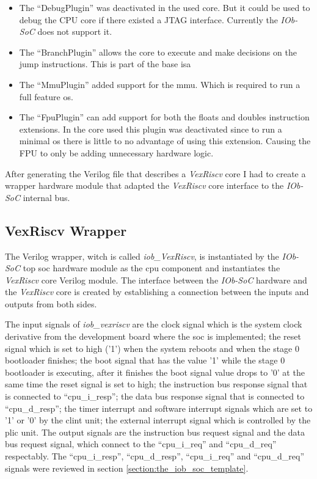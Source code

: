 \begin{itemize}
  \item The \enquote{DebugPlugin} was deactivated in the used core. But it could be used to debug the CPU core if there existed a JTAG interface. Currently the \textit{IOb-SoC} does not support it.
  \item The \enquote{BranchPlugin} allows the core to execute and make decisions on the jump instructions. This is part of the base \acrfull{isa}
  \item The \enquote{MmuPlugin} added support for the \acrfull{mmu}. Which is required to run a full feature \acrshort{os}.
  \item The \enquote{FpuPlugin} can add support for both the floats and doubles instruction extensions. In the core used this plugin was deactivated since to run a minimal \acrshort{os} there is little to no advantage of using this extension. Causing the FPU to only be adding unnecessary hardware logic.
\end{itemize}

After generating the Verilog file that describes a \textit{VexRiscv} core I had to create a wrapper hardware module that adapted the \textit{VexRiscv} core interface to the \textit{IOb-SoC} internal bus.

\subsection{VexRiscv Wrapper}
The Verilog wrapper, witch is called \textit{iob\_VexRiscv}, is instantiated by the \textit{IOb-SoC} top \acrshort{soc} hardware module as the \acrshort{cpu} component and instantiates the \textit{VexRiscv} core Verilog module. The interface between the \textit{IOb-SoC} hardware and the \textit{VexRiscv} core is created by establishing a connection between the inputs and outputs from both sides.

The input signals of \textit{iob\_vexriscv} are the clock signal which is the system clock derivative from the development board where the \acrshort{soc} is implemented; the reset signal which is set to high ('1') when the system reboots and when the stage 0 bootloader finishes; the boot signal that has the value '1' while the stage 0 bootloader is executing, after it finishes the boot signal value drops to '0' at the same time the reset signal is set to high; the instruction bus response signal that is connected to \enquote{cpu\_i\_resp}; the data bus response signal that is connected to \enquote{cpu\_d\_resp}; the timer interrupt and software interrupt signals which are set to '1' or '0' by the \acrshort{clint} unit; the external interrupt signal which is controlled by the \acrshort{plic} unit. The output signals are the instruction bus request signal and the data bus request signal, which connect to the \enquote{cpu\_i\_req} and \enquote{cpu\_d\_req} respectably. The \enquote{cpu\_i\_resp}, \enquote{cpu\_d\_resp}, \enquote{cpu\_i\_req} and \enquote{cpu\_d\_req} signals were reviewed in section \ref{section:the_iob_soc_template}.

